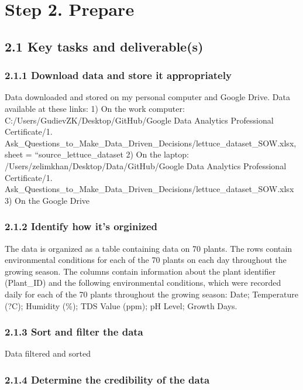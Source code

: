 \documentclass[
]{article}
\begin{document}
\section{Step 2. Prepare}\label{step-2.-prepare}

\subsection{2.1 Key tasks and
deliverable(s)}\label{key-tasks-and-deliverables-1}

\subsubsection{2.1.1 Download data and store it
appropriately}\label{download-data-and-store-it-appropriately}

Data downloaded and stored on my personal computer and Google Drive.
Data available at these links: 1) On the work computer:
C:/Users/GudievZK/Desktop/GitHub/Google Data Analytics Professional
Certificate/1.
Ask\_Questions\_to\_Make\_Data\_Driven\_Decisions/lettuce\_dataset\_SOW.xlsx,
sheet = ``source\_lettuce\_dataset 2) On the laptop:
/Users/zelimkhan/Desktop/Data/GitHub/Google Data Analytics Professional
Certificate/1.
Ask\_Questions\_to\_Make\_Data\_Driven\_Decisions/lettuce\_dataset\_SOW.xlsx
3) On the Google Drive

\subsubsection{2.1.2 Identify how it's
orginized}\label{identify-how-its-orginized}

The data is organized as a table containing data on 70 plants. The rows
contain environmental conditions for each of the 70 plants on each day
throughout the growing season. The columns contain information about the
plant identifier (Plant\_ID) and the following environmental conditions,
which were recorded daily for each of the 70 plants throughout the
growing season: Date; Temperature (?C); Humidity (\%); TDS Value (ppm);
pH Level; Growth Days.

\subsubsection{2.1.3 Sort and filter the
data}\label{sort-and-filter-the-data}

Data filtered and sorted

\subsubsection{2.1.4 Determine the credibility of the
data}\label{determine-the-credibility-of-the-data}
\end{document}
